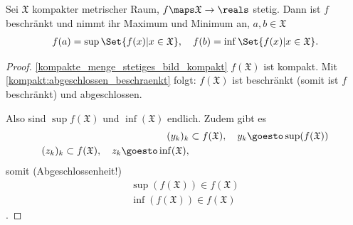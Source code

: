 \begin{satz}\label{funktion_von_kompaktem_metrischen_raum_zu_r_kriegt_min_max}
    Sei \( \mathfrak{X}\) kompakter metrischer Raum, \( f\maps \mathfrak{X}\to \reals \) stetig. Dann ist \( f\) beschränkt und nimmt ihr Maximum und Minimum an, \dh \texists \( a,b \in \mathfrak{X}\)
    \begin{align*}
        f(a)=\sup\Set{f(x)|x\in \mathfrak{X}},\quad f(b)=\inf\Set{f(x)|x\in \mathfrak{X}}.
    \end{align*} 
\end{satz}
\begin{proof}
    \ref{kompakte_menge_stetiges_bild_kompakt} \timplies \( f(\mathfrak{X})\) ist kompakt. Mit \ref{kompakt:abgeschlossen_beschraenkt} folgt: \( f(\mathfrak{X})\) ist beschränkt (somit ist \( f\) beschränkt) und abgeschlossen.
    
    Also sind \( \sup f(\mathfrak{X})\) und \( \inf(\mathfrak{X})\) endlich. Zudem gibt es
    \begin{align*}
        (y_k)_k &\subset f(\mathfrak{X}),\quad y_k\goesto \sup(f(\mathfrak{X}))\\
        (z_k)_k\subset f(\mathfrak{X}), \quad z_k\goesto \inf(\mathfrak{X}),
    \end{align*}
    somit (Abgeschlossenheit!)
    \begin{align*}
        \sup(f(\mathfrak{X}))\in f(\mathfrak{X})\\
        \inf(f(\mathfrak{X}))\in f(\mathfrak{X})
    \end{align*}
    \timplies \Beh.
\end{proof}

